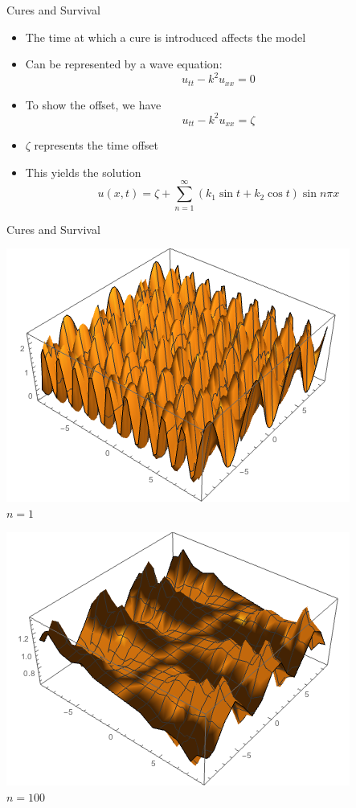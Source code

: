 \documentclass{beamer}
\begin{document}
\begin{frame}{Cures and Survival}
\begin{itemize}
\item The time at which a cure is introduced affects the model
\pause
\item Can be represented by a wave equation:
\[
u_{tt}-k^{2}u_{xx}=0
\]
\pause
\item To show the offset, we have
\[
u_{tt}-k^{2}u_{xx}=\zeta
\]
\pause
\item $\zeta$ represents the time offset
\pause
\item This yields the solution
\[
u(x,t)=\zeta+\sum_{n=1}^{\infty}(k_{1}\sin{t}+k_{2}\cos{t})\sin{n\pi x}
\]
\end{itemize}
\end{frame}

\begin{frame}{Cures and Survival}
\begin{center}

\begin{minipage}{0.4\textwidth}
\includegraphics[scale=0.3]{cure_01}\\
$n=1$
\end{minipage}
\begin{minipage}{0.4\textwidth}
\pause\includegraphics[scale=0.3]{cure_02}\\
$n=100$
\end{minipage}


\end{center}
\end{frame}
\end{document}
